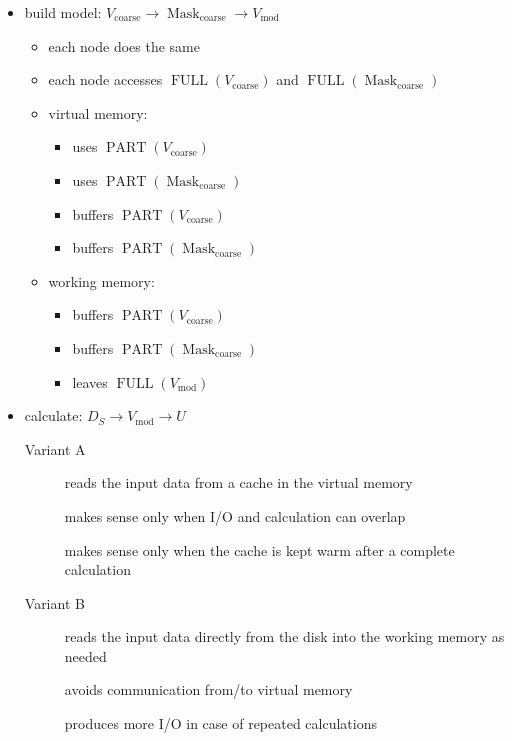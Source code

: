 \documentclass[12pt,a4paper]{article}
\DeclareMathOperator{\mask}{Mask}
\DeclareMathOperator{\coarse}{coarse}
\DeclareMathOperator{\vmod}{mod}
\newcommand{\fieldcoarse}{V_{\coarse}}
\newcommand{\velmodel}{V_{\vmod}}
\newcommand{\maskcoarse}{\mask_{\coarse}}
\newcommand{\slantstacks}{D_S}
\newcommand{\updatedescr}{U}
\DeclareMathOperator{\oppartof}{PART}
\DeclareMathOperator{\opfull}{FULL}
\newcommand{\parens}[3]{#1#3#2}
\newcommand{\K}[1]{\parens{(}{)}{#1}}
\newcommand{\partof}[1]{\oppartof{}\K{#1}}
\newcommand{\full}[1]{\opfull{}\K{#1}}
\begin{document}
\begin{itemize}
\item build model: $\fieldcoarse \to \maskcoarse \to \velmodel$
  \begin{itemize}
  \item each node does the same
  \item each node accesses $\full{\fieldcoarse}$ and $\full{\maskcoarse}$
  \item virtual memory:
    \begin{itemize}
    \item uses $\partof{\fieldcoarse}$
    \item uses $\partof{\maskcoarse}$
    \item buffers $\partof{\fieldcoarse}$
    \item buffers $\partof{\maskcoarse}$
    \end{itemize}
  \item working memory:
    \begin{itemize}
    \item buffers $\partof{\fieldcoarse}$
    \item buffers $\partof{\maskcoarse}$
    \item leaves $\full{\velmodel}$
    \end{itemize}
  \end{itemize}

\item calculate: $\slantstacks \to \velmodel \to \updatedescr$
  \begin{description}
  \item[Variant A] reads the input data from a cache in the virtual
    memory

    makes sense only when I/O and calculation can overlap

    makes sense only when the cache is kept warm after a complete
    calculation

  \item[Variant B] reads the input data directly from the disk into
    the working memory as needed

    avoids communication from/to virtual memory

    produces more I/O in case of repeated calculations


\end{description}
\end{itemize}
\end{document}
